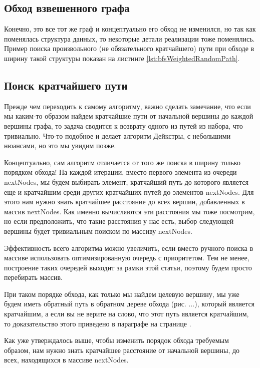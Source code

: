 \documentclass[../article.tex]{subfiles}
\begin{document}
\subsection{Обход взвешенного графа}

Конечно, это все тот же граф и концептуально его обход не изменился, но так как поменялась структура данных, то некоторые детали реализации тоже поменялись. Пример поиска произвольного (не обязательного кратчайшего) пути при обходе в ширину такой структуры показан на листинге \ref{lst:bfsWeightedRandomPath}.

\subsection{Поиск кратчайшего пути}

Прежде чем переходить к самому алгоритму, важно сделать замечание, что если мы каким-то образом найдем кратчайшие пути от начальной вершины до каждой вершины графа, то задача сводится к возврату одного из путей из набора, что тривиально. Что-то подобное и делает алгоритм Дейкстры, с небольшими нюансами, но это мы увидим позже.

Концептуально, сам алгоритм отличается от того же поиска в ширину только порядком обхода! На каждой итерации, вместо первого элемента из очереди nextNodes, мы будем выбирать элемент, кратчайший путь до которого является еще и кратчайшим среди других кратчайших путей до элементов nextNodes. Для этого нам нужно знать кратчайшее расстояние до всех вершин, добавленных в массив nextNodes. Как именно вычисляются эти расстояния мы тоже посмотрим, но если предположить, что такие расстояния у нас есть, выбор следующей вершины будет тривиальным поиском по массиву nextNodes.

Эффективность всего алгоритма можно увеличить, если вместо ручного поиска в массиве использовать оптимизированную очередь с приоритетом. Тем не менее, построение таких очередей выходит за рамки этой статьи, поэтому будем просто перебирать массив.

При таком порядке обхода, как только мы найдем целевую вершину, мы уже будем иметь обратный путь в обратном дереве обхода (рис. ...), который является кратчайшим, а если вы не верите на слово, что этот путь является кратчайшим, то доказательство этого приведено в параграфе на странице \pageref{dijkstraProve}.

Как уже утверждалось выше, чтобы изменить порядок обхода требуемым образом, нам нужно знать кратчайшее расстояние от начальной вершины, до всех, находящихся в массиве nextNodes.
\end{document}
